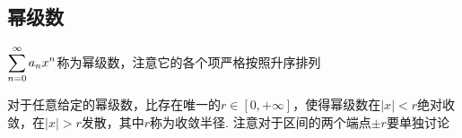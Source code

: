 
\subsection{幂级数}
\begin{definition}[幂级数]
$\displaystyle\sum_{n=0}^{\infty}a_nx^n$称为幂级数，注意它的各个项严格按照升序排列
\end{definition}
\begin{theorem}
对于任意给定的幂级数，比存在唯一的$r\in[0,+\infty]$，使得幂级数在$|x|<r$绝对收敛，在$|x|>r$发散，其中$r$称为收敛半径. 注意对于区间的两个端点$\pm r$要单独讨论
\end{theorem}